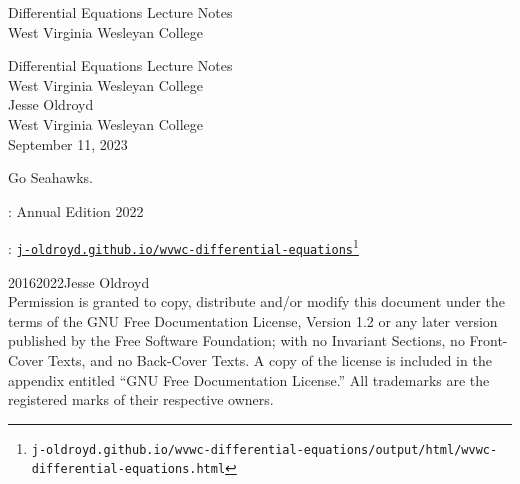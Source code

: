 \documentclass[twoside,10pt,]{book}
\newcommand{\titlepagefont}{\relax}
\newcommand{\mono}[1]{\texttt{#1}}
\numberwithin{equation}{part}
\begin{document}
\raggedbottom
\frontmatter
\thispagestyle{empty}
{\titlepagefont\centering
\vspace*{0.28\textheight}
{\Huge Differential Equations Lecture Notes}\\[2\baselineskip]
{\LARGE West Virginia Wesleyan College}\\
}
\clearpage
\thispagestyle{empty}
\null%
\clearpage
\thispagestyle{empty}
{\titlepagefont\centering
\vspace*{0.14\textheight}
{\Huge Differential Equations Lecture Notes}\\[\baselineskip]
{\LARGE West Virginia Wesleyan College}\\[3\baselineskip]
{\Large Jesse Oldroyd}\\[0.5\baselineskip]
{\Large West Virginia Wesleyan College}\\[3\baselineskip]
{\Large September 11, 2023}\\}
\clearpage
\thispagestyle{empty}
\hypertarget{colophon-front-colophon}{}\noindent
Go Seahawks.%
\par
{}
: Annual Edition 2022\par\medskip
{}: \href{https://j-oldroyd.github.io/wvwc-differential-equations/output/html/wvwc-differential-equations.html}{\mono{j-oldroyd.github.io/wvwc-differential-equations}}\footnote{\nolinkurl{j-oldroyd.github.io/wvwc-differential-equations/output/html/wvwc-differential-equations.html}\label{fn-front-colophon-b-b}}\par\medskip
\noindent\textcopyright{}2016\textendash{}2022\quad{}Jesse Oldroyd\\[0.5\baselineskip]
Permission is granted to copy, distribute and\slash{}or modify this document under the terms of the GNU Free Documentation License, Version 1.2 or any later version published by the Free Software Foundation; with no Invariant Sections, no Front-Cover Texts, and no Back-Cover Texts.  A copy of the license is included in the appendix entitled ``GNU Free Documentation License.''  All trademarks\texttrademark{} are the registered\textregistered{} marks of their respective owners.\par\medskip
\end{document}
